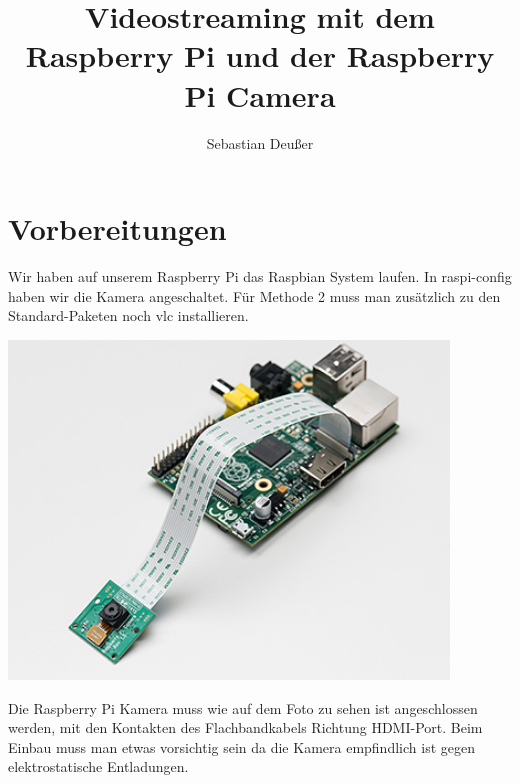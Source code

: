 \documentclass[12pt,a4paper,titlepage]{scrartcl} %
\title{Videostreaming mit dem Raspberry Pi und der Raspberry Pi Camera}
\author{Sebastian Deußer}
\begin{document}
\maketitle %

\pagestyle{fancy}
\lhead{}
\chead{\leftmark}
\rhead{}
\cfoot{}

\thispagestyle{fancy}

\section{Vorbereitungen}
Wir haben auf unserem Raspberry Pi das Raspbian System laufen. In raspi-config haben wir die Kamera angeschaltet. Für Methode 2 muss man zusätzlich zu den Standard-Paketen noch vlc installieren.
	\begin{center}
		\includegraphics[height=9cm]{Streaming/1367_MED}
	\end{center}
Die Raspberry Pi Kamera muss wie auf dem Foto zu sehen ist angeschlossen werden, mit den Kontakten des Flachbandkabels Richtung HDMI-Port. Beim Einbau muss man etwas vorsichtig sein da die Kamera empfindlich ist gegen elektrostatische Entladungen.

\newpage
\end{document}
